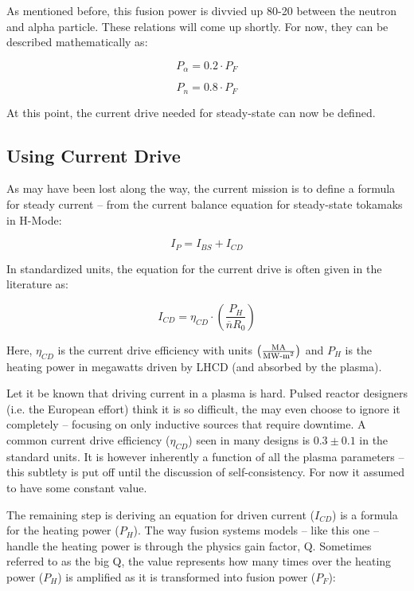 \documentclass[11pt]{book}
\begin{document}
As mentioned before, this fusion power is divvied up 80-20 between the neutron and alpha particle. These relations will come up shortly. For now, they can be described mathematically as:

\begin{equation}
	P_\alpha = 0.2 \cdot P_F
\end{equation}

\begin{equation}
	P_n = 0.8 \cdot P_F
\end{equation}

At this point, the current drive needed for steady-state can now be defined.

\subsection{Using Current Drive}

As may have been lost along the way, the current mission is to define a formula for steady current -- from the current balance equation for steady-state tokamaks in H-Mode:

\begin{equation}
	\label{eq:ibal}
	I_P = I_{BS} + I_{CD}
\end{equation}

In standardized units, the equation for the current drive is often given in the literature as:

\begin{equation}
	I_{CD} = \eta_{CD} \cdot \left( \frac{P_H}{\overline n R_0} \right)
\end{equation}

Here, $\eta_{CD}$ is the current drive efficiency with units $ \left(
\frac{ \textnormal{MA} }{ \textnormal{MW-m}^2 } \right) $ and $P_H$ is the heating power in megawatts driven by LHCD (and absorbed by the plasma).

Let it be known that driving current in a plasma is hard. Pulsed reactor designers (i.e. the European effort) think it is so difficult, the may even choose to ignore it completely -- focusing on only inductive sources that require downtime. A common current drive efficiency ($\eta_{CD}$) seen in many designs is $0.3 \pm 0.1 $ in the standard units. It is however inherently a function of all the plasma parameters -- this subtlety is put off until the discussion of self-consistency. For now it assumed to have some constant value.

The remaining step is deriving an equation for driven current ($I_{CD}$) is a formula for the heating power ($P_H$). The way fusion systems models -- like this one -- handle the heating power is through the physics gain factor, Q. Sometimes referred to as the big Q, the value represents how many times over the heating power ($P_H$) is amplified as it is transformed into fusion power ($P_F$):
\end{document}
